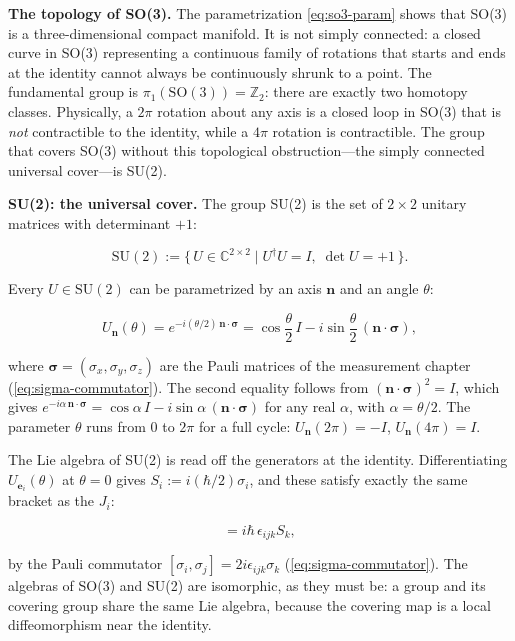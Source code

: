 \medskip\noindent\textbf{The topology of SO(3).} The parametrization \eqref{eq:so3-param} shows that SO(3) is a three-dimensional compact manifold. It is not simply connected: a closed curve in SO(3) representing a continuous family of rotations that starts and ends at the identity cannot always be continuously shrunk to a point. The fundamental group is $\pi_1(\mathrm{SO}(3)) = \mathbb{Z}_2$: there are exactly two homotopy classes. Physically, a $2\pi$ rotation about any axis is a closed loop in SO(3) that is \emph{not} contractible to the identity, while a $4\pi$ rotation is contractible. The group that covers SO(3) without this topological obstruction---the simply connected universal cover---is SU(2).

\medskip\noindent\textbf{SU(2): the universal cover.} The group SU(2) is the set of $2\times2$ unitary matrices with determinant $+1$:
\begin{linenomath}
    \begin{equation}
        \mathrm{SU}(2) := \{\,U\in\mathbb{C}^{2\times2}\mid U^\dagger U = I,\;\det U = +1\,\}.
    \end{equation}
\end{linenomath}
Every $U\in\mathrm{SU}(2)$ can be parametrized by an axis $\bm n$ and an angle $\theta$:
\begin{linenomath}
    \begin{equation}
        U_{\bm n}(\theta) = e^{-i(\theta/2)\,\bm n\cdot\bm\sigma}
        = \cos\frac{\theta}{2}\,I - i\sin\frac{\theta}{2}\,(\bm n\cdot\bm\sigma),
        \label{eq:su2-param}
    \end{equation}
\end{linenomath}
where $\bm\sigma = (\sigma_x,\sigma_y,\sigma_z)$ are the Pauli matrices of the measurement chapter (\eqref{eq:sigma-commutator}). The second equality follows from $(\bm n\cdot\bm\sigma)^2 = I$, which gives $e^{-i\alpha\,\bm n\cdot\bm\sigma} = \cos\alpha\,I - i\sin\alpha\,(\bm n\cdot\bm\sigma)$ for any real $\alpha$, with $\alpha = \theta/2$. The parameter $\theta$ runs from $0$ to $2\pi$ for a full cycle: $U_{\bm n}(2\pi)=-I$, $U_{\bm n}(4\pi)=I$.

The Lie algebra of SU(2) is read off the generators at the identity. Differentiating $U_{\bm e_i}(\theta)$ at $\theta=0$ gives $S_i := i(\hbar/2)\sigma_i$, and these satisfy exactly the same bracket as the $J_i$:
\begin{linenomath}
    \begin{equation}
        [S_i,S_j] = i\hbar\,\epsilon_{ijk}S_k,
    \end{equation}
\end{linenomath}
by the Pauli commutator $[\sigma_i,\sigma_j]=2i\epsilon_{ijk}\sigma_k$ (\eqref{eq:sigma-commutator}). The algebras of SO(3) and SU(2) are isomorphic, as they must be: a group and its covering group share the same Lie algebra, because the covering map is a local diffeomorphism near the identity.

